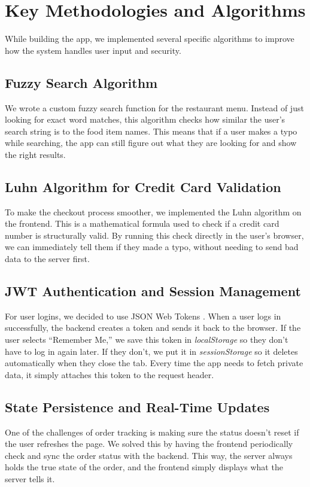\documentclass[conference]{IEEEtran}
\begin{document}
\section{Key Methodologies and Algorithms}
While building the app, we implemented several specific algorithms to improve how the system handles user input and security.

\subsection{Fuzzy Search Algorithm}
We wrote a custom fuzzy search function for the restaurant menu. Instead of just looking for exact word matches, this algorithm checks how similar the user's search string is to the food item names. This means that if a user makes a typo while searching, the app can still figure out what they are looking for and show the right results.

\subsection{Luhn Algorithm for Credit Card Validation}
To make the checkout process smoother, we implemented the Luhn algorithm \cite{b6} on the frontend. This is a mathematical formula used to check if a credit card number is structurally valid. By running this check directly in the user's browser, we can immediately tell them if they made a typo, without needing to send bad data to the server first.

\subsection{JWT Authentication and Session Management}
For user logins, we decided to use JSON Web Tokens \cite{b7}. When a user logs in successfully, the backend creates a token and sends it back to the browser. If the user selects ``Remember Me,'' we save this token in \textit{localStorage} so they don't have to log in again later. If they don't, we put it in \textit{sessionStorage} so it deletes automatically when they close the tab. Every time the app needs to fetch private data, it simply attaches this token to the request header.

\subsection{State Persistence and Real-Time Updates}
One of the challenges of order tracking is making sure the status doesn't reset if the user refreshes the page. We solved this by having the frontend periodically check and sync the order status with the backend. This way, the server always holds the true state of the order, and the frontend simply displays what the server tells it.
\end{document}

